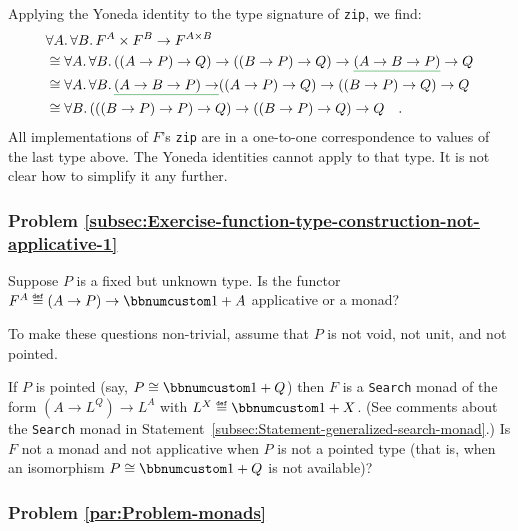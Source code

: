 Applying the Yoneda identity to the type signature of \lstinline!zip!,
we find:
\begin{align*}
 & \forall A.\,\forall B.\,F^{A}\times F^{B}\rightarrow F^{A\times B}\\
 & \cong\forall A.\,\forall B.\,((A\rightarrow P)\rightarrow Q)\rightarrow((B\rightarrow P)\rightarrow Q)\rightarrow\gunderline{(A\rightarrow B\rightarrow P)}\rightarrow Q\\
 & \cong\forall A.\,\forall B.\,\gunderline{(A\rightarrow B\rightarrow P)\rightarrow}((A\rightarrow P)\rightarrow Q)\rightarrow((B\rightarrow P)\rightarrow Q)\rightarrow Q\\
 & \cong\forall B.\,(((B\rightarrow P)\rightarrow P)\rightarrow Q)\rightarrow((B\rightarrow P)\rightarrow Q)\rightarrow Q\quad.
\end{align*}
All implementations of $F$\textsf{'}s \lstinline!zip! are in a one-to-one
correspondence to values of the last type above. The Yoneda identities
cannot apply to that type. It is not clear how to simplify it any
further.

\subsubsection{Problem \label{subsec:Exercise-function-type-construction-not-applicative-1}\ref{subsec:Exercise-function-type-construction-not-applicative-1}}

Suppose $P$ is a fixed but unknown type. Is the functor $F^{A}\triangleq\left(A\rightarrow P\right)\rightarrow\bbnum 1+A$
applicative or a monad?

To make these questions non-trivial, assume that $P$ is not void,
not unit, and not pointed.

If $P$ is pointed (say, $P\cong\bbnum 1+Q$) then $F$ is a \lstinline!Search!
monad of the form $(A\rightarrow L^{Q})\rightarrow L^{A}$ with $L^{X}\triangleq\bbnum 1+X$.
(See comments about the \lstinline!Search! monad in Statement~\ref{subsec:Statement-generalized-search-monad}.)
Is $F$ not a monad and not applicative when $P$ is not a pointed
type (that is, when an isomorphism $P\cong\bbnum 1+Q$ is not available)?

\subsubsection{Problem \label{par:Problem-monads}\ref{par:Problem-monads}}


